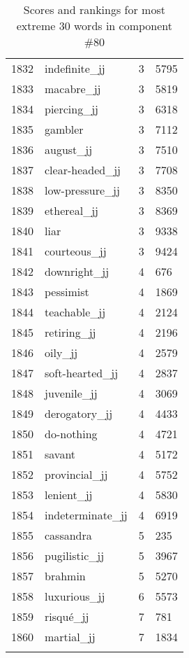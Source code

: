 \begin{longtable}[!htbp]{| rlr@{.}l |}
    1832 & indefinite\_jj & 3 & 5795 \\
    1833 & macabre\_jj & 3 & 5819 \\
    1834 & piercing\_jj & 3 & 6318 \\
    1835 & gambler & 3 & 7112 \\
    1836 & august\_jj & 3 & 7510 \\
    1837 & clear-headed\_jj & 3 & 7708 \\
    1838 & low-pressure\_jj & 3 & 8350 \\
    1839 & ethereal\_jj & 3 & 8369 \\
    1840 & liar & 3 & 9338 \\
    1841 & courteous\_jj & 3 & 9424 \\
    1842 & downright\_jj & 4 & 676 \\
    1843 & pessimist & 4 & 1869 \\
    1844 & teachable\_jj & 4 & 2124 \\
    1845 & retiring\_jj & 4 & 2196 \\
    1846 & oily\_jj & 4 & 2579 \\
    1847 & soft-hearted\_jj & 4 & 2837 \\
    1848 & juvenile\_jj & 4 & 3069 \\
    1849 & derogatory\_jj & 4 & 4433 \\
    1850 & do-nothing & 4 & 4721 \\
    1851 & savant & 4 & 5172 \\
    1852 & provincial\_jj & 4 & 5752 \\
    1853 & lenient\_jj & 4 & 5830 \\
    1854 & indeterminate\_jj & 4 & 6919 \\
    1855 & cassandra & 5 & 235 \\
    1856 & pugilistic\_jj & 5 & 3967 \\
    1857 & brahmin & 5 & 5270 \\
    1858 & luxurious\_jj & 6 & 5573 \\
    1859 & risqué\_jj & 7 & 781 \\
    1860 & martial\_jj & 7 & 1834 \\
    \hline
    \caption{Scores and rankings for most extreme 30 words in component \#80} \\
\end{longtable}
